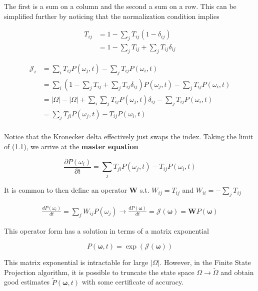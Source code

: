 \documentclass{ucetd}
\begin{document}
The first is a sum on a column and the second a sum on a row. This can be simplified further by noticing that the normalization condition implies

\begin{align*}
T_{ij} &= 1 - \sum_{j}T_{ij}(1-\delta_{ij})\\
&= 1 - \sum_{j}T_{ij} + \sum_{j}T_{ij}\delta_{ij}
\end{align*}


\begin{align*}
\mathcal{J}_{i} &= \sum_{i}T_{ij}P(\omega_{j},t) - \sum_{j}T_{ij}P(\omega_{i},t)\\
&= \sum_{i}\left(1 - \sum_{j}T_{ij} + \sum_{j}T_{ij}\delta_{ij}\right)P(\omega_{j},t) - \sum_{j}T_{ij}P(\omega_{i},t)\\
&= |\Omega| - |\Omega| + \sum_{i}\sum_{j}T_{ij}P(\omega_{j},t)\delta_{ij} - \sum_{j}T_{ij}P(\omega_{i},t)\\
&= \sum_{j}T_{ji}P(\omega_{j},t) - T_{ij}P(\omega_{i},t)\\
\end{align*}

Notice that the Kronecker delta effectively just swaps the index. Taking the limit of (1.1), we arrive at the \textbf{master equation}


\begin{equation*}
\frac{\partial P(\omega_{i})}{\partial t} = \sum_{j}T_{ji}P(\omega_{j},t) - T_{ij}P(\omega_{i},t)
\end{equation*}

It is common to then define an operator $\bm{W}$ s.t. $W_{ij} = T_{ij}$ and $W_{ii} = -\sum_{j}T_{ij}$ 

\begin{align*}
\frac{dP(\omega_{i})}{dt} = \sum_{j}W_{ij}P(\omega_{j}) \rightarrow \frac{dP(\bm{\omega})}{dt} = \mathcal{J}(\bm{\omega}) = \mathbf{W}P(\bm{\omega})
\end{align*}

This operator form has a solution in terms of a matrix exponential

\begin{equation*}
P(\bm{\omega}, t) = \exp(\mathcal{J}(\bm{\omega}))
\end{equation*}

This matrix exponential is intractable for large $|\Omega|$. However, in the Finite State Projection algorithm, it is possible to truncate the state space $\Omega \rightarrow \tilde{\Omega}$ and obtain good estimates $\tilde{P}(\bm{\omega}, t)$ with some certificate of accuracy.
\end{document}
